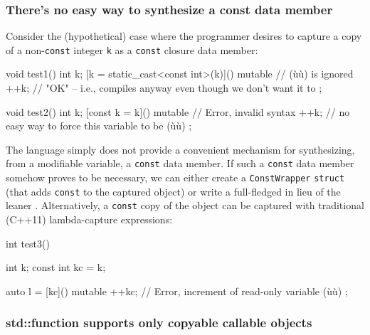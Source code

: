\subsubsection[There’s no easy way to synthesize a \lstinline!const! data member]{There’s no easy way to synthesize a {\SubsubsecCode const} data member}\label{there’s-no-easy-way-to-synthesize-a-const-data-member}

Consider the (hypothetical) case where the programmer desires to capture
a copy of a non-\lstinline!const! integer \lstinline!k! as a \lstinline!const!
closure data member:

\begin{emcppslisting}[emcppsstandards={c++14}]
void test1()
{
    int k;
    [k = static_cast<const int>(k)]() mutable  // (ù{}ù) is ignored
    {
        ++k;  // "OK" -- i.e., compiles anyway even though we don't want it to
    };
}
\end{emcppslisting}

\begin{emcppslisting}[emcppsstandards={c++14}]
void test2()
{
    int k;
    [const k = k]() mutable  // Error, invalid syntax
    {
        ++k;  // no easy way to force this variable to be (ù{}ù)
    };
}
\end{emcppslisting}
    
\noindent The language simply does not provide a convenient mechanism for
synthesizing, from a modifiable variable, a \lstinline!const! data member.
If such a \lstinline!const! data member somehow proves to be necessary, we
can either create a \lstinline!ConstWrapper! \lstinline!struct! (that adds
\lstinline!const! to the captured object) or write a full-fledged
 in lieu of the leaner . Alternatively, a \lstinline!const! copy of the object can be
captured with traditional (C++11) lambda-capture expressions:

\begin{emcppslisting}
int test3()
{
    int k;
    const int kc = k;

    auto l = [kc]() mutable
    {
        ++kc;  // Error, increment of read-only variable (ù{}ù)
    };
}
\end{emcppslisting}
    

\subsubsection[\lstinline!std::function! supports only copyable callable objects]{{\SubsubsecCode std::function} supports only copyable callable objects}\label{std::function-supports-only-copyable-callable-objects}

